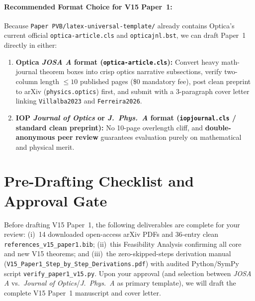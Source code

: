 \documentclass[10pt,letterpaper]{article}
\begin{document}
\paragraph*{Recommended Format Choice for V15 Paper~1:}
Because \texttt{Paper PVB/latex-universal-template/} already contains Optica's current official \texttt{optica-article.cls} and \texttt{opticajnl.bst}, we can draft Paper~1 directly in either:
\begin{enumerate}[leftmargin=1.5em,itemsep=2pt,topsep=2pt]
  \item \textbf{Optica \emph{JOSA A} format (\texttt{optica-article.cls}):} Convert heavy math-journal theorem boxes into crisp optics narrative subsections, verify two-column length $\le 10$ published pages (\$0 mandatory fee), post clean preprint to arXiv (\texttt{physics.optics}) first, and submit with a 3-paragraph cover letter linking \texttt{Villalba2023} and \texttt{Ferreira2026}.
  \item \textbf{IOP \emph{Journal of Optics} or \emph{J.\ Phys.\ A} format (\texttt{iopjournal.cls} / standard clean preprint):} No 10-page overlength cliff, and \textbf{double-anonymous peer review} guarantees evaluation purely on mathematical and physical merit.
\end{enumerate}

\section{Pre-Drafting Checklist and Approval Gate}
\label{sec:checklist}

Before drafting V15 Paper~1, the following deliverables are complete for your review: (i)~14 downloaded open-access arXiv PDFs and 36-entry clean \texttt{references\_v15\_paper1.bib}; (ii)~this Feasibility Analysis confirming all core and new V15 theorems; and (iii)~the zero-skipped-steps derivation manual (\texttt{V15\_Paper1\_Step\_by\_Step\_Derivations.pdf}) with audited Python/SymPy script \texttt{verify\_paper1\_v15.py}. Upon your approval (and selection between \emph{JOSA A} vs.\ \emph{Journal of Optics}/\emph{J.\ Phys.\ A} as primary template), we will draft the complete V15 Paper~1 manuscript and cover letter.


\setlength{\bibsep}{1.8pt}
{\footnotesize

}
\end{document}
